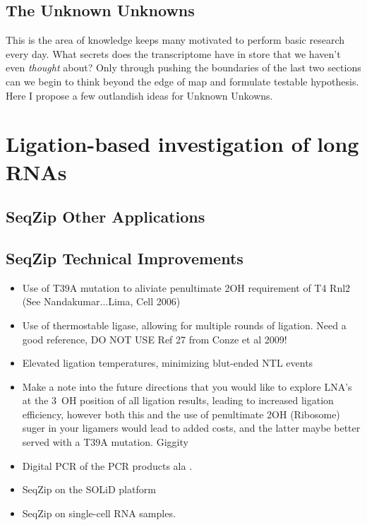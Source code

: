 \subsection{The Unknown Unknowns}\label{subsec: The Unknown Unknowns}

This is the area of knowledge keeps many motivated to perform basic research every day. What secrets does the transcriptome have in store that we haven't even \textit{thought} about? Only through pushing the boundaries of the last two sections can we begin to think beyond the edge of map and formulate testable hypothesis. Here I propose a few outlandish ideas for Unknown Unkowns.


\section{Ligation-based investigation of long RNAs}
\subsection{SeqZip Other Applications}
\subsection{SeqZip Technical Improvements}

\begin{itemize}
	\item Use of T39A mutation to aliviate penultimate 2\textprime OH requirement of T4 Rnl2 (See Nandakumar...Lima, Cell 2006)
	\item Use of thermostable ligase, allowing for multiple rounds of ligation. Need a good reference, DO NOT USE Ref 27 from Conze et al 2009!
	\item Elevated ligation temperatures, minimizing blut-ended NTL events
	\item Make a note into the future directions that you would like to explore LNA’s at the 3\textprime~OH position of all ligation results, leading to increased ligation efficiency, however both this and the use of penultimate 2\textprime OH (Ribosome) suger in your ligamers would lead to added costs, and the latter maybe better served with a T39A mutation. Giggity  
	\item Digital PCR of the PCR products ala \citep{Shiroguchi2012a}. 
	\item SeqZip on the SOLiD platform
	\item SeqZip on single-cell RNA samples.  
\end{itemize}

